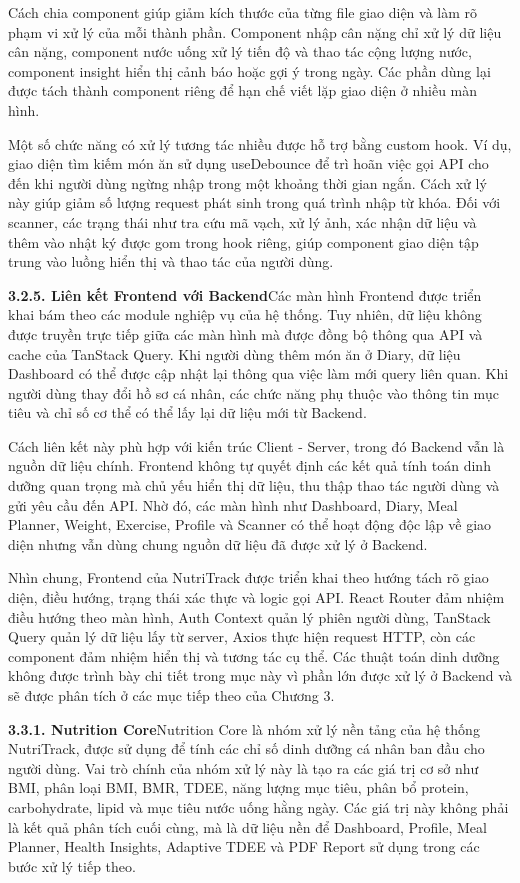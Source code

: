 Cách chia component giúp giảm kích thước của từng file giao diện và làm rõ phạm vi xử lý của mỗi thành phần. Component nhập cân nặng chỉ xử lý dữ liệu cân nặng, component nước uống xử lý tiến độ và thao tác cộng lượng nước, component insight hiển thị cảnh báo hoặc gợi ý trong ngày. Các phần dùng lại được tách thành component riêng để hạn chế viết lặp giao diện ở nhiều màn hình.

Một số chức năng có xử lý tương tác nhiều được hỗ trợ bằng custom hook. Ví dụ, giao diện tìm kiếm món ăn sử dụng useDebounce để trì hoãn việc gọi API cho đến khi người dùng ngừng nhập trong một khoảng thời gian ngắn. Cách xử lý này giúp giảm số lượng request phát sinh trong quá trình nhập từ khóa. Đối với scanner, các trạng thái như tra cứu mã vạch, xử lý ảnh, xác nhận dữ liệu và thêm vào nhật ký được gom trong hook riêng, giúp component giao diện tập trung vào luồng hiển thị và thao tác của người dùng.

\textbf{3.2.5. Liên kết Frontend với Backend}Các màn hình Frontend được triển khai bám theo các module nghiệp vụ của hệ thống. Tuy nhiên, dữ liệu không được truyền trực tiếp giữa các màn hình mà được đồng bộ thông qua API và cache của TanStack Query. Khi người dùng thêm món ăn ở Diary, dữ liệu Dashboard có thể được cập nhật lại thông qua việc làm mới query liên quan. Khi người dùng thay đổi hồ sơ cá nhân, các chức năng phụ thuộc vào thông tin mục tiêu và chỉ số cơ thể có thể lấy lại dữ liệu mới từ Backend.

Cách liên kết này phù hợp với kiến trúc Client - Server, trong đó Backend vẫn là nguồn dữ liệu chính. Frontend không tự quyết định các kết quả tính toán dinh dưỡng quan trọng mà chủ yếu hiển thị dữ liệu, thu thập thao tác người dùng và gửi yêu cầu đến API. Nhờ đó, các màn hình như Dashboard, Diary, Meal Planner, Weight, Exercise, Profile và Scanner có thể hoạt động độc lập về giao diện nhưng vẫn dùng chung nguồn dữ liệu đã được xử lý ở Backend.

Nhìn chung, Frontend của NutriTrack được triển khai theo hướng tách rõ giao diện, điều hướng, trạng thái xác thực và logic gọi API. React Router đảm nhiệm điều hướng theo màn hình, Auth Context quản lý phiên người dùng, TanStack Query quản lý dữ liệu lấy từ server, Axios thực hiện request HTTP, còn các component đảm nhiệm hiển thị và tương tác cụ thể. Các thuật toán dinh dưỡng không được trình bày chi tiết trong mục này vì phần lớn được xử lý ở Backend và sẽ được phân tích ở các mục tiếp theo của Chương 3.

\textbf{3.3.1. Nutrition Core}Nutrition Core là nhóm xử lý nền tảng của hệ thống NutriTrack, được sử dụng để tính các chỉ số dinh dưỡng cá nhân ban đầu cho người dùng. Vai trò chính của nhóm xử lý này là tạo ra các giá trị cơ sở như BMI, phân loại BMI, BMR, TDEE, năng lượng mục tiêu, phân bổ protein, carbohydrate, lipid và mục tiêu nước uống hằng ngày. Các giá trị này không phải là kết quả phân tích cuối cùng, mà là dữ liệu nền để Dashboard, Profile, Meal Planner, Health Insights, Adaptive TDEE và PDF Report sử dụng trong các bước xử lý tiếp theo.

